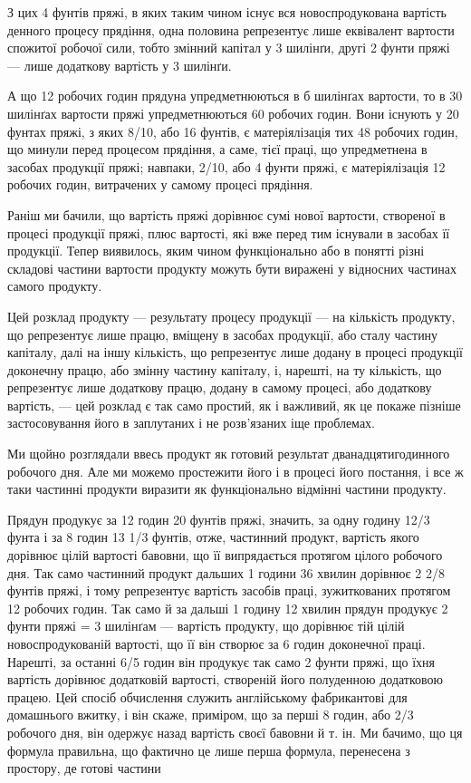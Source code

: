 З цих 4 фунтів пряжі, в яких таким чином існує вся новоспродукована вартість денного процесу
прядіння, одна половина
репрезентує лише еквівалент вартости спожитої робочої сили, тобто змінний капітал у 3 шилінґи, другі
2 фунти пряжі — лише додаткову вартість у 3 шилінґи.

А що 12 робочих годин прядуна упредметнюються в б шилінґах вартости, то в 30 шилінґах вартости пряжі
упредметнюються 60 робочих годин. Вони існують у 20 фунтах пряжі, з яких 8/10,
або 16 фунтів, є матеріялізація тих 48 робочих годин, що минули перед процесом прядіння, а саме,
тієї праці, що упредметнена в засобах продукції пряжі; навпаки, 2/10, або 4 фунти пряжі, є
матеріялізація 12 робочих годин, витрачених у самому процесі прядіння.

Раніш ми бачили, що вартість пряжі дорівнює сумі нової вартости, створеної в процесі продукції
пряжі, плюс вартості,
які вже перед тим існували в засобах її продукції. Тепер виявилось, яким чином функціонально або в
понятті різні складові
частини вартости продукту можуть бути виражені у відносних частинах самого продукту.

Цей розклад продукту — результату процесу продукції — на кількість продукту, що репрезентує лише
працю, вміщену в
засобах продукції, або сталу частину капіталу, далі на іншу кількість, що репрезентує лише додану в
процесі продукції доконечну працю, або змінну частину капіталу, і, нарешті, на ту
кількість, що репрезентує лише додаткову працю, додану в самому процесі, або додаткову вартість, —
цей розклад є так само простий, як і важливий, як це покаже пізніше застосовування його в заплутаних
і не розв’язаних іще проблемах.

Ми щойно розглядали ввесь продукт як готовий результат дванадцятигодинного робочого дня. Але ми
можемо простежити
його і в процесі його постання, і все ж таки частинні продукти виразити як функціонально відмінні
частини продукту.

Прядун продукує за 12 годин 20 фунтів пряжі, значить, за одну годину 12/3 фунта і за 8 годин 13 1/3
фунтів, отже, частинний
продукт, вартість якого дорівнює цілій вартості бавовни, що її випрядається протягом цілого робочого
дня. Так само частинний продукт дальших 1 години 36 хвилин дорівнює 2 2/8 фунтів пряжі,
і тому репрезентує вартість засобів праці, зужиткованих протягом 12 робочих годин. Так само й за
дальші 1 годину 12 хвилин
прядун продукує 2 фунти пряжі = 3 шилінґам — вартість продукту, що дорівнює тій цілій
новоспродукованій вартості, що її він створює за 6 годин доконечної праці. Нарешті, за останні 6/5
годин він продукує так само 2 фунти пряжі, що їхня вартість дорівнює додатковій вартості, створеній
його полуденною додатковою працею.
Цей спосіб обчислення служить англійському фабрикантові для домашнього вжитку, і він скаже,
приміром, що за перші 8 годин, або 2/3 робочого дня, він одержує назад вартість своєї бавовни
й т. ін. Ми бачимо, що ця формула правильна, що фактично це лише перша формула, перенесена з
простору, де готові частини
\parbreak{}  %
